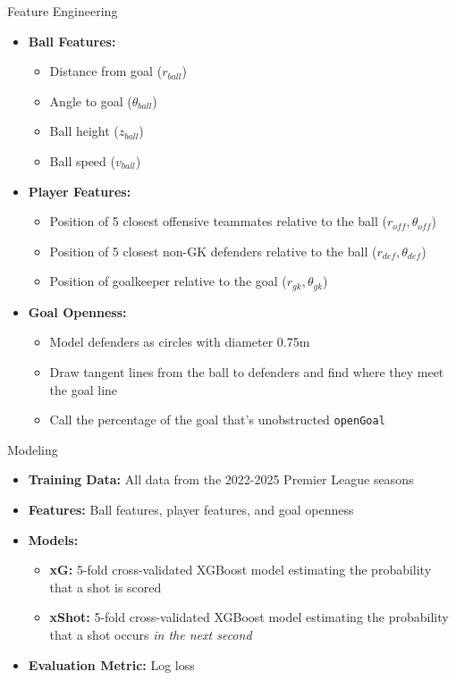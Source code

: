 \documentclass{beamer}
\begin{document}
\begin{frame}{Feature Engineering}
\begin{itemize}
\item \textbf{Ball Features:}
  \begin{itemize}
  \item Distance from goal ($r_{ball}$)
  \item Angle to goal ($\theta_{ball}$)
  \item Ball height ($z_{ball}$)
  \item Ball speed ($v_{ball}$)
  \end{itemize}
\item \textbf{Player Features:}
  \begin{itemize}
  \item Position of 5 closest offensive teammates relative to the ball ($r_{off}, \theta_{off}$)
  \item Position of 5 closest non-GK defenders relative to the ball ($r_{def}, \theta_{def}$)
  \item Position of goalkeeper relative to the goal ($r_{gk}, \theta_{gk}$)
  \end{itemize}
\item \textbf{Goal Openness:}
  \begin{itemize}
    \item Model defenders as circles with diameter 0.75m
    \item Draw tangent lines from the ball to defenders and find where they meet the goal line
    \item Call the percentage of the goal that's unobstructed \texttt{openGoal}
  \end{itemize}
\end{itemize}
\end{frame}

\begin{frame}{Modeling}
\begin{itemize}
\item \textbf{Training Data:} All data from the 2022-2025 Premier League seasons
\item \textbf{Features:} Ball features, player features, and goal openness
\item \textbf{Models:}
  \begin{itemize}
  \item \textbf{xG:} 5-fold cross-validated XGBoost model estimating the probability that a shot is scored
\item \textbf{xShot:} 5-fold cross-validated XGBoost model estimating the probability that a shot occurs \emph{in the next second}
  \end{itemize}
\item \textbf{Evaluation Metric:} Log loss
\end{itemize}
\end{frame}
\end{document}
